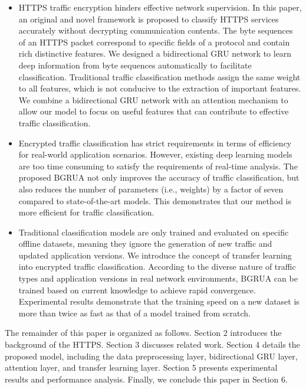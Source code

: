 \documentclass[preprint,12pt]{elsarticle}
\begin{document}
\begin{itemize}
\setlength{\itemsep}{0pt}
\setlength{\parsep}{0pt}
\setlength{\parskip}{0pt}
\item HTTPS traffic encryption hinders effective network supervision. In this paper, an original and novel framework is proposed to classify HTTPS services accurately without decrypting communication contents. The byte sequences of an HTTPS packet correspond to specific fields of a protocol and contain rich distinctive features. We designed a bidirectional GRU network to learn deep information from byte sequences automatically to facilitate classification. Traditional traffic classification methods assign the same weight to all features, which is not conducive to the extraction of important features. We combine a bidirectional GRU network with an attention mechanism to allow our model to focus on useful features that can contribute to effective traffic classification.

%
\item Encrypted traffic classification has strict requirements in terms of efficiency for real-world application scenarios. However, existing deep learning models are too time consuming to satisfy the requirements of real-time analysis. The proposed BGRUA not only improves the accuracy of traffic classification, but also reduces the number of parameters (i.e., weights) by a factor of seven compared to state-of-the-art models. This demonstrates that our method is more efficient for traffic classification.

%
\item Traditional classification models are only trained and evaluated on specific offline datasets, meaning they ignore the generation of new traffic and updated application versions. We introduce the concept of transfer learning into encrypted traffic classification. According to the diverse nature of traffic types and application versions in real network environments, BGRUA can be trained based on current knowledge to achieve rapid convergence. Experimental results demonstrate that the training speed on a new dataset is more than twice as fast as that of a model trained from scratch. 

\end{itemize}

The remainder of this paper is organized as follows. Section 2 introduces the background of the HTTPS. Section 3 discusses related work. Section 4 details the proposed model, including the data preprocessing layer, bidirectional GRU layer, attention layer, and transfer learning layer. Section 5 presents experimental results and performance analysis. Finally, we conclude this paper in Section 6.
\end{document}
